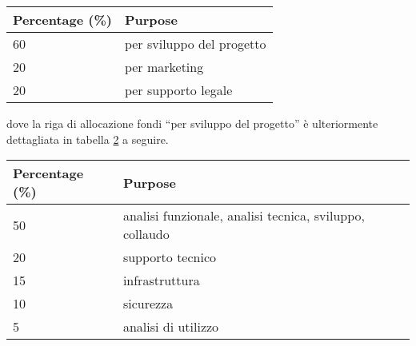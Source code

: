 \vspace{5mm}
\begin{table}[H]
	\centering
	\begin{tabular}{l l}
		\toprule
		\textbf{Percentage (\%)} & \textbf{Purpose} \\
		\midrule
		60		& per sviluppo del progetto	\\
		20		& per marketing	\\
		20		& per supporto legale	\\
		\bottomrule
	\end{tabular}
	\label{tab:division}
\end{table}

\vspace{5mm}
dove la riga di allocazione fondi ``per sviluppo del progetto'' è ulteriormente dettagliata in 
tabella \ref{tab:focus} a seguire.

\vspace{5mm}
\begin{table}[H]
	\centering
	\begin{tabular}{l l}
		\toprule
		\textbf{Percentage (\%)} & \textbf{Purpose} \\
		\midrule
		50		& analisi funzionale, analisi tecnica, sviluppo, collaudo	\\
		20		& supporto tecnico	\\
		15		& infrastruttura	\\
		10		& sicurezza	\\
		5		& analisi di utilizzo	\\
		\bottomrule
	\end{tabular}
	\label{tab:focus}
\end{table}
